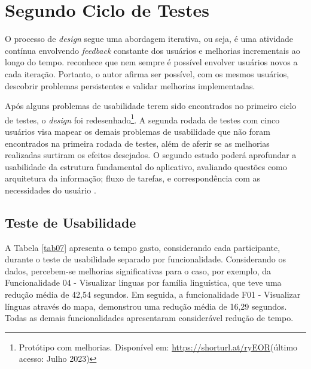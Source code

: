 \section{Segundo Ciclo de Testes}
\label{sec:Segundo Ciclo}
O processo de \textit{design} segue uma abordagem iterativa, ou seja, é uma atividade contínua envolvendo \textit{feedback} constante dos usuários e melhorias incrementais ao longo do tempo.  
reconhece que nem sempre é possível envolver usuários novos a cada iteração. Portanto, o autor afirma ser possível, com os mesmos usuários, descobrir problemas persistentes e validar melhorias implementadas. 

Após alguns problemas de usabilidade terem sido encontrados no primeiro ciclo de testes, o \textit{design} foi redesenhado\footnote{Protótipo com melhorias. Disponível em: \url{https://shorturl.at/ryEOR}(último acesso: Julho 2023)}. 
A segunda rodada de testes com cinco usuários visa mapear os demais problemas de usabilidade que não foram encontrados na primeira rodada de testes, além de aferir se as melhorias realizadas surtiram os efeitos desejados. O segundo estudo poderá aprofundar a 
usabilidade da estrutura fundamental do aplicativo, avaliando questões como arquitetura da informação; fluxo de tarefas, e correspondência com as necessidades do usuário \cite{usabilitytest}.

\subsection{Teste de Usabilidade}
\label{sec:Segundo Teste de Usabilidade}
A Tabela \ref{tab07} apresenta o tempo gasto, considerando cada participante, durante o teste de usabilidade separado por funcionalidade. Considerando os dados, percebem-se melhorias significativas para o caso, por exemplo, da Funcionalidade 04 - Visualizar línguas 
por família linguística, que teve uma redução média de 42,54 segundos. Em seguida, a funcionalidade F01 - Visualizar línguas através do mapa, demonstrou uma redução média de 16,29 segundos. Todas as demais funcionalidades apresentaram considerável redução de 
tempo. 


